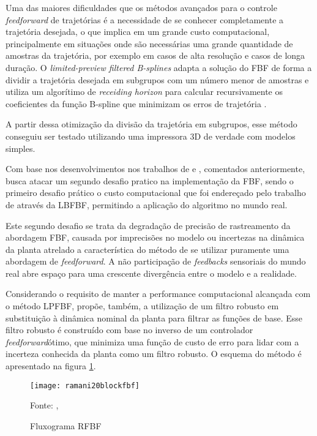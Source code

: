 Uma das maiores dificuldades que os métodos avançados para o
controle \textit{feedforward} de trajetórias é a necessidade de se conhecer
completamente a trajetória desejada, o que implica em um grande custo
computacional, principalmente em situações onde são necessárias uma
grande quantidade de amostras da trajetória, por exemplo em casos de alta resolução
e casos de longa duração.
O \textit{limited-preview filtered B-splines} adapta a solução do FBF de forma a dividir a 
trajetória desejada em subgrupos com um número menor de amostras e utiliza um algorítimo de 
\textit{receiding horizon} para calcular recursivamente os coeficientes da função B-spline que 
minimizam os erros de trajetória \cite{duan18}.

A partir dessa otimização da divisão da trajetória em subgrupos, esse método
conseguiu ser testado utilizando uma impressora 3D de verdade com modelos simples.

Com base nos desenvolvimentos nos trabalhos de \cite{ramani17} e \cite{duan18}, comentados anteriormente, 
\cite{ramani20} busca atacar um segundo desafio pratico na implementação da FBF, sendo o primeiro desafio prático
o custo computacional que foi endereçado pelo trabalho de \cite{duan18} através da LBFBF, permitindo a aplicação
do algoritmo no mundo real.

Este segundo desafio se trata da degradação de precisão de rastreamento da abordagem FBF, causada por
imprecisões no modelo ou incertezas na dinâmica da planta atrelado a característica do método de se
utilizar puramente uma abordagem de \textit{feedforward}. A não participação de \textit{feedbacks} sensoriais
do mundo real abre espaço para uma crescente divergência entre o modelo e a realidade.

Considerando o requisito de manter a performance computacional alcançada com o método LPFBF, \cite{ramani20} 
propõe, também, a utilização de um filtro robusto em substituição à dinâmica nominal da planta para 
filtrar as funções de base. Esse filtro robusto é construído com base no inverso de um controlador 
\textit{feedforward}ótimo, que minimiza uma função de custo de erro para lidar com a incerteza conhecida da planta 
como um filtro robusto.
O esquema do método é apresentado na figura \ref{fig:flowchart_rfbf}.

\begin{figure}[H]
    \centering
    \caption{Fluxograma RFBF}
    \texttt{[image: ramani20blockfbf]}

    {\footnotesize Fonte: \citeauthor{ramani20}, \citeyear{ramani20}}
    \label{fig:flowchart_rfbf}
\end{figure}

